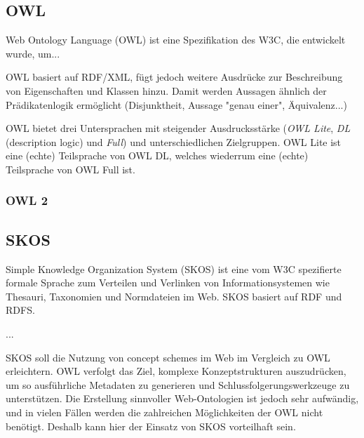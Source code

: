 	\subsection{OWL}
	Web Ontology Language (OWL) ist eine Spezifikation des W3C, die entwickelt wurde, um...
	
	OWL basiert auf RDF/XML, fügt jedoch weitere Ausdrücke zur Beschreibung von Eigenschaften und Klassen hinzu. Damit werden Aussagen ähnlich der Prädikatenlogik ermöglicht (Disjunktheit, Aussage "genau einer", Äquivalenz...)
	
	OWL bietet drei Untersprachen mit steigender Ausdrucksstärke (\emph{OWL Lite}, \emph{DL} (description logic) und \emph{Full}) und unterschiedlichen Zielgruppen. OWL Lite ist eine (echte) Teilsprache von OWL DL, welches wiederrum eine (echte) Teilsprache von OWL Full ist.
	
	
	\subsubsection{OWL 2}
	
	\subsection{SKOS}
	Simple Knowledge Organization System (SKOS) ist eine vom W3C spezifierte formale Sprache zum Verteilen und Verlinken von Informationsystemen wie Thesauri, Taxonomien und Normdateien im Web. SKOS basiert auf RDF und RDFS.
	
	...
	
	SKOS soll die Nutzung von concept schemes im Web im Vergleich zu OWL erleichtern. OWL verfolgt das Ziel, komplexe Konzeptstrukturen auszudrücken, um so ausführliche Metadaten zu generieren und Schlussfolgerungswerkzeuge zu unterstützen. Die Erstellung sinnvoller Web-Ontologien ist jedoch sehr aufwändig, und in vielen Fällen werden die zahlreichen Möglichkeiten der OWL nicht benötigt. Deshalb kann hier der Einsatz von SKOS vorteilhaft sein.
	
	
	
	
